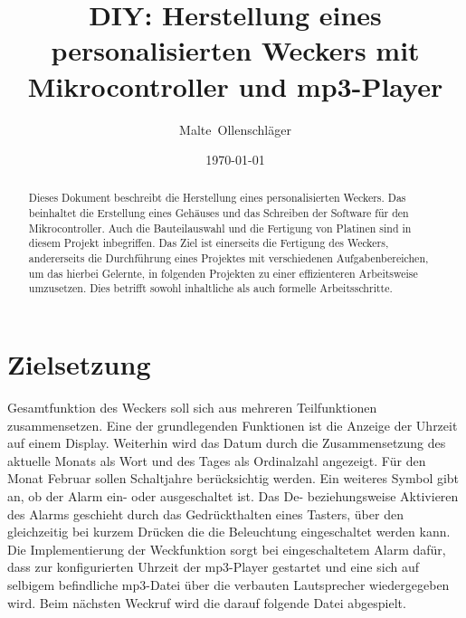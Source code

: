 \documentclass[journal, a4paper]{IEEEtran}
\date{\today}
\author{Malte~Ollenschläger}
\title{DIY: Herstellung eines personalisierten Weckers mit Mikrocontroller und mp3-Player}
\begin{document}
\maketitle
\begin{abstract}
	Dieses Dokument beschreibt die Herstellung eines personalisierten Weckers. Das beinhaltet die Erstellung eines Gehäuses und das Schreiben der Software für den Mikrocontroller. Auch die Bauteilauswahl und die Fertigung von Platinen sind in diesem Projekt inbegriffen. Das Ziel ist einerseits die Fertigung des Weckers, andererseits die Durchführung eines Projektes mit verschiedenen Aufgabenbereichen, um das hierbei Gelernte, in folgenden Projekten zu einer effizienteren Arbeitsweise umzusetzen. Dies betrifft sowohl inhaltliche als auch formelle Arbeitsschritte.
\end{abstract}


\section{Zielsetzung}
	 Gesamtfunktion des Weckers soll sich aus mehreren Teilfunktionen zusammensetzen. Eine der grundlegenden Funktionen ist die Anzeige der Uhrzeit auf einem Display. Weiterhin wird das Datum durch die Zusammensetzung des aktuelle Monats als Wort und des Tages als Ordinalzahl angezeigt. Für den Monat Februar sollen Schaltjahre berücksichtig werden. %
	Ein weiteres Symbol gibt an, ob der Alarm ein- oder ausgeschaltet ist. Das De- beziehungsweise Aktivieren des Alarms geschieht durch das Gedrückthalten eines Tasters, über den gleichzeitig bei kurzem Drücken die die Beleuchtung eingeschaltet werden kann. Die Implementierung der Weckfunktion sorgt bei eingeschaltetem Alarm dafür, dass zur konfigurierten Uhrzeit der mp3-Player gestartet und eine sich auf selbigem befindliche mp3-Datei über die verbauten Lautsprecher wiedergegeben wird. Beim nächsten Weckruf wird die darauf folgende Datei abgespielt.\par
\end{document}
